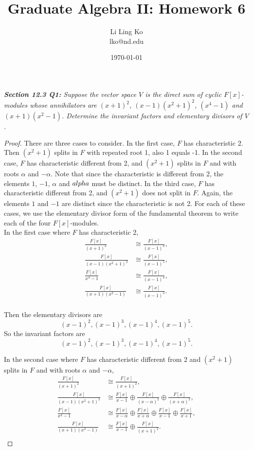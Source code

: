 \documentclass{article}
\begin{document}
\title{Graduate Algebra II: Homework 6}
\author{Li Ling Ko\\ lko@nd.edu}
\date{\today}
\maketitle

\it \textbf{Section 12.3 Q1:} Suppose the vector space $V$ is the direct
  sum of cyclic $F[x]$-modules whose annihilators are $(x+1)^2$,
  $(x-1)(x^2+1)^2$, $(x^4-1)$ and $(x+1)(x^2-1)$. Determine the invariant
  factors and elementary divisors of $V$.

  \begin{proof}
    There are three cases to consider. In the first case, $F$ has
    characteristic 2. Then $(x^2+1)$ splits in $F$ with repeated root 1,
    also 1 equals -1. In the second case, $F$ has characteristic different
    from 2, and $(x^2+1)$ splits in $F$ and with roots $\alpha$ and
    $-\alpha$. Note that since the characteristic is different from 2, the
    elements $1$, $-1$, $\alpha$ and $\-alpha$ must be distinct. In the
    third case, $F$ has characteristic different from 2, and $(x^2+1)$ does
    not split in $F$. Again, the elements $1$ and $-1$ are distinct since
    the characteristic is not 2. For each of these cases, we use the
    elementary divisor form of the fundamental theorem to write each of the
    four $F[x]$-modules. \\

    In the first case where $F$ has characteristic 2,
    \begin{align*}
      \frac{F[x]}{(x+1)^2} &\cong \frac{F[x]}{(x-1)^2},\\
      \frac{F[x]}{(x-1)(x^2+1)^2} &\cong \frac{F[x]}{(x-1)^5},\\
      \frac{F[x]}{x^4-1} &\cong \frac{F[x]}{(x-1)^4},\\
      \frac{F[x]}{(x+1)(x^2-1)} &\cong \frac{F[x]}{(x-1)^3}.\\
    \end{align*}

    Then the elementary divisors are
    \[(x-1)^2, (x-1)^3, (x-1)^4, (x-1)^5.\]
    So the invariant factors are
    \[(x-1)^2, (x-1)^3, (x-1)^4, (x-1)^5.\]

    In the second case where $F$ has characteristic different
    from 2 and $(x^2+1)$ splits in $F$ and with roots $\alpha$ and
    $-\alpha$,
    \begin{align*}
      \frac{F[x]}{(x+1)^2} &\cong \frac{F[x]}{(x+1)^2},\\
      \frac{F[x]}{(x-1)(x^2+1)^2} &\cong \frac{F[x]}{x-1} \oplus
        \frac{F[x]}{(x-\alpha)^2} \oplus \frac{F[x]}{(x+\alpha)^2},\\
      \frac{F[x]}{x^4-1} &\cong \frac{F[x]}{x-\alpha} \oplus
        \frac{F[x]}{x+\alpha} \oplus \frac{F[x]}{x-1} \oplus
        \frac{F[x]}{x+1},\\
      \frac{F[x]}{(x+1)(x^2-1)} &\cong \frac{F[x]}{x-1} \oplus
        \frac{F[x]}{(x+1)^2}.\\
    \end{align*}


\end{proof}
\end{document}
